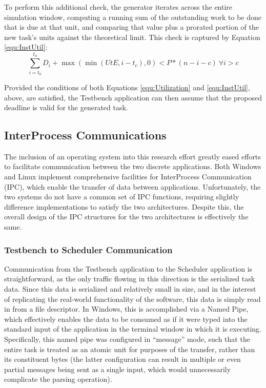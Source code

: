 To perform this additional check, the generator iterates across the entire simulation window, computing a running sum of the outstanding work to be done that is due at that unit, and comparing that value plus a prorated portion of the new task's units against the theoretical limit. This check is captured by Equation \ref{equ:InstUtil}:
\begin{equation}\label{equ:InstUtil}
    \sum_{i=t_0}^{t_n}D_i + \max(\min(UtE, i - t_c), 0) < P*(n-i-c)\:\forall i>c
\end{equation}

Provided the conditions of both Equations \ref{equ:Utilization} and \ref{equ:InstUtil}, above, are satisfied, the Testbench application can then assume that the proposed deadline is valid for the generated task.

\subsection{InterProcess Communications}\label{subsec:IPC}
The inclusion of an operating system into this research effort greatly eased efforts to facilitate communication between the two discrete applications. Both Windows and Linux implement comprehensive facilities for InterProcess Communication (IPC), which enable the transfer of data between applications. Unfortunately, the two systems do not have a common set of IPC functions, requiring slightly difference implementations to satisfy the two architectures. Despite this, the overall design of the IPC structures for the two architectures is effectively the same.

\subsubsection{Testbench to Scheduler Communication}\label{subsubsec:TestbenchSchedIPC}
Communication from the Testbench application to the Scheduler application is straightforward, as the only traffic flowing in this direction is the serialized task data. Since this data is serialized and relatively small in size, and in the interest of replicating the real-world functionality of the software, this data is simply read in from a file descriptor. In Windows, this is accomplished via a Named Pipe, which effectively enables the data to be consumed as if it were typed into the standard input of the application in the terminal window in which it is executing. Specifically, this named pipe was configured in ``message'' mode, such that the entire task is treated as an atomic unit for purposes of the transfer, rather than its constituent bytes (the latter configuration can result in multiple or even partial messages being sent as a single input, which would unnecessarily complicate the parsing operation).

